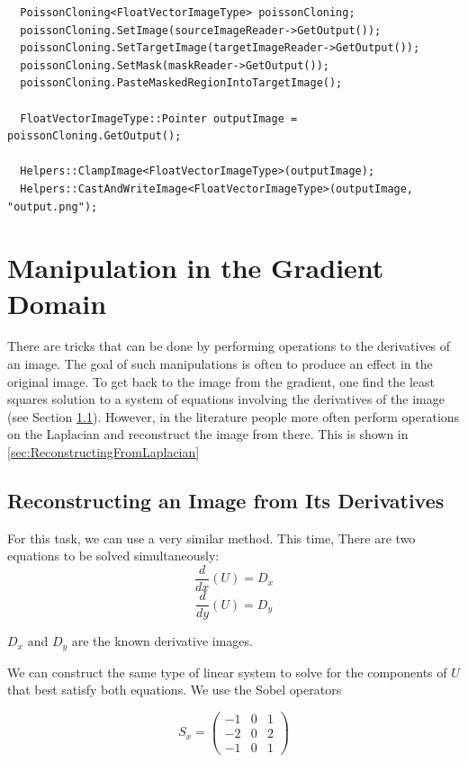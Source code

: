 \documentclass{InsightArticle}
\begin{document}
\begin{verbatim}
  PoissonCloning<FloatVectorImageType> poissonCloning;
  poissonCloning.SetImage(sourceImageReader->GetOutput());
  poissonCloning.SetTargetImage(targetImageReader->GetOutput());
  poissonCloning.SetMask(maskReader->GetOutput());
  poissonCloning.PasteMaskedRegionIntoTargetImage();

  FloatVectorImageType::Pointer outputImage = poissonCloning.GetOutput();

  Helpers::ClampImage<FloatVectorImageType>(outputImage);
  Helpers::CastAndWriteImage<FloatVectorImageType>(outputImage, "output.png");
\end{verbatim}

\section{Manipulation in the Gradient Domain}
There are tricks that can be done by performing operations to the derivatives of an image. The goal of such manipulations is often to produce an effect in the original image. To get back to the image from the gradient, one find the least squares solution to a system of equations involving the derivatives of the image (see Section \ref{sec:ReconstructingFromDerivatives}). However, in the literature people more often perform operations on the Laplacian and reconstruct the image from there. This is shown in \ref{sec:ReconstructingFromLaplacian}

\subsection{Reconstructing an Image from Its Derivatives}
\label{sec:ReconstructingFromDerivatives}
For this task, we can use a very similar method. This time, There are two equations to be solved simultaneously:
\begin{equation}
\frac{d}{dx}(U) = D_x
\end{equation}
\begin{equation}
\frac{d}{dy}(U) = D_y
\end{equation}

$D_x$ and $D_y$ are the known derivative images.

We can construct the same type of linear system to solve for the components of $U$ that best satisfy both equations. We use the Sobel operators

\begin{equation}
S_x =
\begin{pmatrix}
-1 & 0 & 1 \\
-2 & 0 & 2\\
-1 & 0 & 1
\end{pmatrix}
\end{equation}
\end{document}
